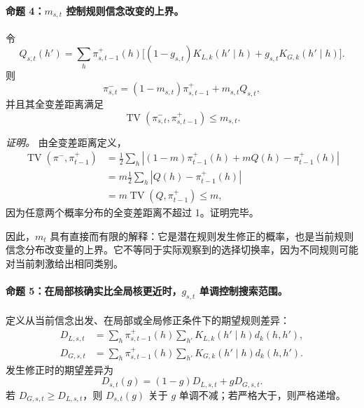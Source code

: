 \paragraph{命题 4：$m_{s,t}$ 控制规则信念改变的上界。}
令
\begin{equation}
    Q_{s,t}(h')
    =\sum_h\pi^+_{s,t-1}(h)
      \big[(1-g_{s,t})K_{L,k}(h'\mid h)
      +g_{s,t}K_{G,k}(h'\mid h)\big].
\end{equation}
则
\begin{equation}
    \pi^-_{s,t}
    =(1-m_{s,t})\pi^+_{s,t-1}
      +m_{s,t}Q_{s,t},
\end{equation}
并且其全变差距离满足
\begin{equation}
    \operatorname{TV}
    (\pi^-_{s,t},\pi^+_{s,t-1})
    \leq m_{s,t}.
    \label{eq:model0803-tv-bound}
\end{equation}

\textit{证明。}
由全变差距离定义，
\begin{align}
    \operatorname{TV}(\pi^-,\pi^+_{t-1})
    &=\frac12\sum_h
      |(1-m)\pi^+_{t-1}(h)+mQ(h)-\pi^+_{t-1}(h)|\\
    &=m\frac12\sum_h|Q(h)-\pi^+_{t-1}(h)|\\
    &=m\operatorname{TV}(Q,\pi^+_{t-1})\leq m,
\end{align}
因为任意两个概率分布的全变差距离不超过 1。证明完毕。

因此，$m_t$ 具有直接而有限的解释：它是潜在规则发生修正的概率，也是当前规则信念分布改变量的上界。它不等同于实际观察到的选择切换率，因为不同规则可能对当前刺激给出相同类别。

\paragraph{命题 5：在局部核确实比全局核更近时，$g_{s,t}$ 单调控制搜索范围。}
定义从当前信念出发、在局部或全局修正条件下的期望规则差异：
\begin{align}
    D_{L,s,t}
    &=\sum_h\pi^+_{s,t-1}(h)
      \sum_{h'}K_{L,k}(h'\mid h)d_k(h,h'),\\
    D_{G,s,t}
    &=\sum_h\pi^+_{s,t-1}(h)
      \sum_{h'}K_{G,k}(h'\mid h)d_k(h,h').
    \label{eq:model0803-local-global-distance}
\end{align}
发生修正时的期望差异为
\begin{equation}
    D_{s,t}(g)
    =(1-g)D_{L,s,t}+gD_{G,s,t}.
    \label{eq:model0803-search-distance}
\end{equation}
若 $D_{G,s,t}\geq D_{L,s,t}$，则 $D_{s,t}(g)$ 关于 $g$ 单调不减；若严格大于，则严格递增。

